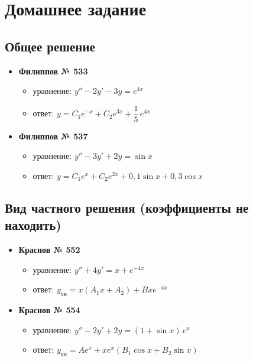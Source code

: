 \documentclass[11pt,a4paper]{article}
\newcommand{\ych}{y_{\text{чн}}}
\begin{document}
\section*{Домашнее задание}

\subsection*{Общее решение}
\begin{itemize}[topsep=2pt]
  \item \textbf{Филиппов № 533}
  \begin{itemize}
    \item уравнение: $y'' - 2y' - 3y = e^{4x}$
    \item ответ: $y = C_1 e^{-x} + C_2 e^{3x} + \dfrac15\, e^{4x}$
  \end{itemize}
  \item \textbf{Филиппов № 537}
  \begin{itemize}
    \item уравнение: $y'' - 3y' + 2y = \sin x$
    \item ответ: $y = C_1 e^{x} + C_2 e^{2x} + 0{,}1\sin x + 0{,}3\cos x$
  \end{itemize}
\end{itemize}

\subsection*{Вид частного решения (коэффициенты не находить)}
\begin{itemize}[topsep=2pt]
  \item \textbf{Краснов № 552}
  \begin{itemize}
    \item уравнение: $y'' + 4y' = x + e^{-4x}$
    \item ответ: $\ych = x(A_1 x + A_2) + B x e^{-4x}$
  \end{itemize}
  \item \textbf{Краснов № 554}
  \begin{itemize}
    \item уравнение: $y'' - 2y' + 2y = (1 + \sin x)\, e^{x}$
    \item ответ: $\ych = A e^{x} + x e^{x}(B_1\cos x + B_2\sin x)$
  \end{itemize}
\end{itemize}

\newpage
\end{document}
